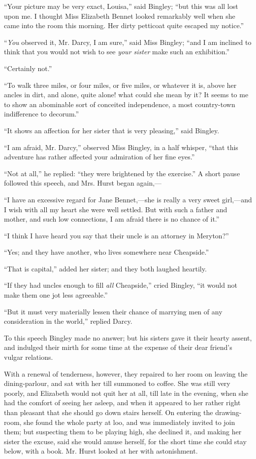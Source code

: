\documentclass[12pt,openright]{book}
\begin{document}
“Your picture may be very exact, Louisa,” said Bingley; “but this was all lost upon me. I thought Miss Elizabeth Bennet looked remarkably well when she came into the room this morning. Her dirty petticoat quite escaped my notice.”

“\textit{You} observed it, Mr. Darcy, I am sure,” said Miss Bingley; “and I am inclined to think that you would not wish to see \textit{your sister} make such an exhibition.”

“Certainly not.”

“To walk three miles, or four miles, or five miles, or whatever it is, above her ancles in dirt, and alone, quite alone! what could she mean by it? It seems to me to show an abominable sort of conceited independence, a most country-town indifference to decorum.”

“It shows an affection for her sister that is very pleasing,” said Bingley.

“I am afraid, Mr. Darcy,” observed Miss Bingley, in a half whisper, “that this adventure has rather affected your admiration of her fine eyes.”

“Not at all,” he replied: “they were brightened by the exercise.” A short pause followed this speech, and Mrs. Hurst began again,—

“I have an excessive regard for Jane Bennet,—she is really a very sweet girl,—and I wish with all my heart she were well settled. But with such a father and mother, and such low connections, I am afraid there is no chance of it.”

“I think I have heard you say that their uncle is an attorney in Meryton?”

“Yes; and they have another, who lives somewhere near Cheapside.”

“That is capital,” added her sister; and they both laughed heartily.

“If they had uncles enough to fill \textit{all} Cheapside,” cried Bingley, “it would not make them one jot less agreeable.”

“But it must very materially lessen their chance of marrying men of any consideration in the world,” replied Darcy.

To this speech Bingley made no answer; but his sisters gave it their hearty assent, and indulged their mirth for some time at the expense of their dear friend’s vulgar relations.

With a renewal of tenderness, however, they repaired to her room on leaving the dining-parlour, and sat with her till summoned to coffee. She was still very poorly, and Elizabeth would not quit her at all, till late in the evening, when she had the comfort of seeing her asleep, and when it appeared to her rather right than pleasant that she should go down stairs herself. On entering the drawing-room, she found the whole party at loo, and was immediately invited to join them; but suspecting them to be playing high, she declined it, and making her sister the excuse, said she would amuse herself, for the short time she could stay below, with a book. Mr. Hurst looked at her with astonishment.
\end{document}
